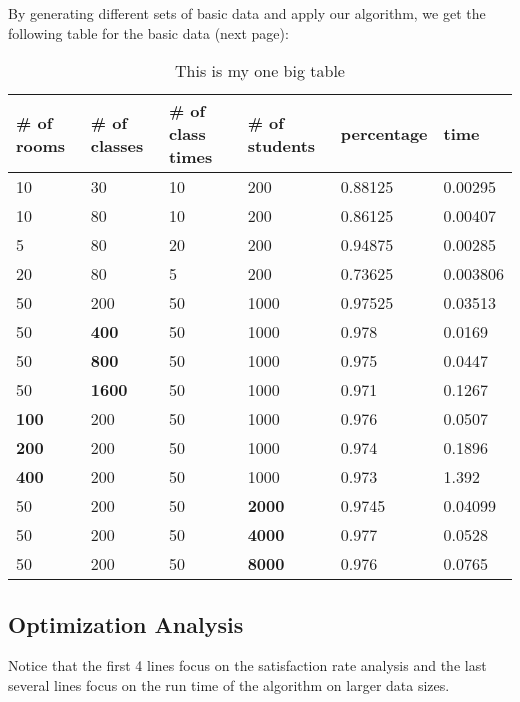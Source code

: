 \documentclass[11pt, oneside]{article}   	%
\begin{document}
By generating different sets of basic data and apply our algorithm, we get the following table for the basic data (next page):
\begin{table}[h]
\begin{tabular}{|l|l|l|l|l|l|}
\hline
\# of rooms & \# of classes & \# of class times & \# of students & percentage & time     \\ \hline
10          & 30            & 10                & 200            & 0.88125    & 0.00295  \\ \hline
10          & 80            & 10                & 200            & 0.86125    & 0.00407  \\ \hline
5           & 80            & 20                & 200            & 0.94875    & 0.00285  \\ \hline
20          & 80            & 5                 & 200            & 0.73625    & 0.003806 \\ \hline
\hline
50          & 200           & 50                & 1000           & 0.97525    & 0.03513  \\ \hline
\hline
50          & \textbf{400}           & 50                & 1000           & 0.978    & 0.0169  \\ \hline
50          & \textbf{800}           & 50                & 1000           & 0.975    & 0.0447  \\ \hline
50          & \textbf{1600}           & 50                & 1000           & 0.971    & 0.1267  \\ \hline
\textbf{100}          & 200           & 50                & 1000           & 0.976    & 0.0507  \\ \hline
\textbf{200}          & 200           & 50                & 1000           & 0.974    & 0.1896  \\ \hline
\textbf{400}          & 200           & 50                & 1000           & 0.973    & 1.392  \\ \hline
50          & 200           & 50                & \textbf{2000}           & 0.9745    & 0.04099  \\ \hline
50          & 200           & 50                & \textbf{4000}           & 0.977    & 0.0528  \\ \hline
50          & 200           & 50                & \textbf{8000}           & 0.976    & 0.0765  \\ \hline
\end{tabular}
\caption{This is my one big table} \label{tab:sometab}
\end{table}
\subsection{Optimization Analysis}
Notice that the first 4 lines focus on the satisfaction rate analysis and the last several lines focus on the run time of the algorithm on larger data sizes.
\end{document}
